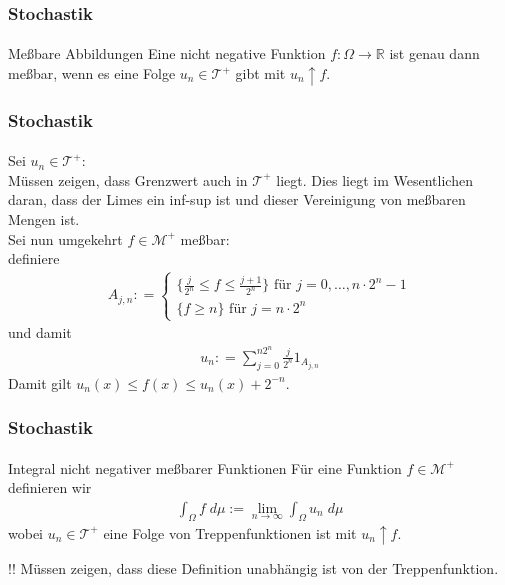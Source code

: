 \documentclass{beamer}
\begin{document}
\begin{frame}
    \frametitle{Stochastik}
\framesubtitle{}
    \begin{block}{Meßbare Abbildungen}
        Eine nicht negative Funktion $f:\Omega \to \mathbb{R}$ ist genau dann meßbar, wenn
        es eine Folge $u_n \in \mathcal{T}^+$ gibt mit $u_n \uparrow f$.
    \end{block}

\end{frame}


\begin{frame}
    \frametitle{Stochastik}
\framesubtitle{}
Sei $u_n \in \mathcal{T}^+$: \\
Müssen zeigen, dass Grenzwert auch in $\mathcal{T}^+$ liegt.
Dies liegt im Wesentlichen daran, dass der Limes ein inf-sup ist und dieser Vereinigung von meßbaren Mengen ist.
\\
Sei nun umgekehrt $f \in \mathcal{M}^+$ meßbar: \\
definiere
\begin{align*}
    A_{j,n} : = \begin{cases} 
        \{ \frac{j}{2^n} \leq f \leq \frac{j+1}{2^n} \} \text{ für } j= 0, \dots, n \cdot 2^n -1 \\
        \{  f \geq n \} \text{ für } j= n \cdot 2^n 
    \end{cases}
\end{align*}
und damit 
\begin{align*}
    u_n : =  \sum_{j= 0}^{n2^n} \frac{j}{2^n} 1_{A_{j,n}}
\end{align*}
Damit gilt $u_n(x) \leq f(x) \leq u_n(x) +2^{-n}$.
\end{frame}



 
\begin{frame}
    \frametitle{Stochastik}
\framesubtitle{}
    \begin{block}{Integral nicht negativer meßbarer Funktionen}
        Für eine Funktion $f \in \mathcal{M}^+$ definieren wir
        \begin{align*}
            \int_{\Omega} f \;  d \mu := \lim_{n \to \infty} \int_{\Omega} u_n \; d \mu  
        \end{align*}
        wobei $u_n \in \mathcal{T}^+$ eine Folge von Treppenfunktionen ist mit 
        $u_n \uparrow f$.

        
    \end{block}
    \begin{block}{!!}
    Müssen zeigen, dass diese Definition unabhängig ist von der Treppenfunktion.
\end{block}
\end{frame}
\end{document}
